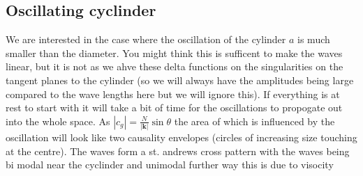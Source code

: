 \documentclass{article}
\begin{document}
\subsection{Oscillating cyclinder}
We are interested in the case where the oscillation of the cylinder $a$ is much smaller than the diameter. You might think this is sufficent to make the waves linear, but it is not as we ahve these delta functions on the singularities on the tangent planes to the cylinder (so we will always have the amplitudes being large compared to the wave lengths here but we will ignore this). If everything is at rest to start with it will take a bit of time for the oscillations to propogate out into the whole space. As $|c_g| = \frac{N}{|\bm k|} \sin \theta$ the area of which is influenced by the oscillation will look like two causality envelopes (circles of increasing size touching at the centre). The waves form a st. andrews cross pattern with the waves being bi modal near the cyclinder and unimodal further way this is due to visocity
\end{document}

